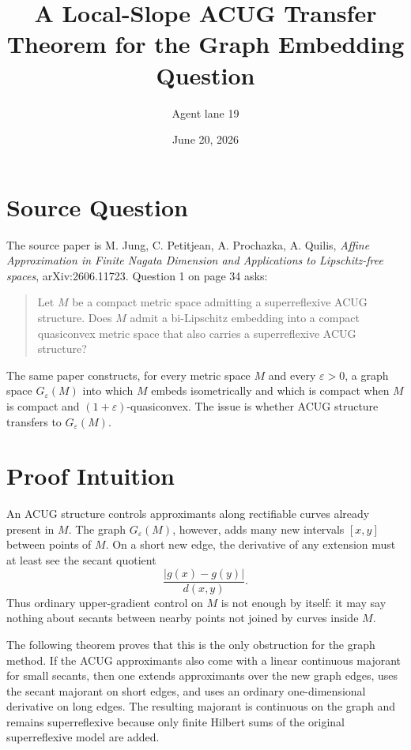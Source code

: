 \documentclass[11pt]{article}
\title{A Local-Slope ACUG Transfer Theorem for the Graph Embedding Question}
\author{Agent lane 19}
\date{June 20, 2026}
\newcommand{\eps}{\varepsilon}
\begin{document}
\maketitle

\section*{Source Question}

The source paper is M. Jung, C. Petitjean, A. Prochazka, A. Quilis,
\emph{Affine Approximation in Finite Nagata Dimension and Applications to
Lipschitz-free spaces}, arXiv:2606.11723.
Question 1 on page 34 asks:
\begin{quote}
Let \(M\) be a compact metric space admitting a superreflexive ACUG structure.
Does \(M\) admit a bi-Lipschitz embedding into a compact quasiconvex metric
space that also carries a superreflexive ACUG structure?
\end{quote}

The same paper constructs, for every metric space \(M\) and every
\(\eps>0\), a graph space \(G_\eps(M)\) into which \(M\) embeds isometrically
and which is compact when \(M\) is compact and \((1+\eps)\)-quasiconvex.
The issue is whether ACUG structure transfers to \(G_\eps(M)\).

\section*{Proof Intuition}

An ACUG structure controls approximants along rectifiable curves already
present in \(M\).  The graph \(G_\eps(M)\), however, adds many new intervals
\([x,y]\) between points of \(M\).  On a short new edge, the derivative of any
extension must at least see the secant quotient
\[
   \frac{|g(x)-g(y)|}{d(x,y)}.
\]
Thus ordinary upper-gradient control on \(M\) is not enough by itself: it may
say nothing about secants between nearby points not joined by curves inside
\(M\).

The following theorem proves that this is the only obstruction for the graph
method.  If the ACUG approximants also come with a linear continuous majorant
for small secants, then one extends approximants over the new graph edges,
uses the secant majorant on short edges, and uses an ordinary one-dimensional
derivative on long edges.  The resulting majorant is continuous on the graph
and remains superreflexive because only finite Hilbert sums of the original
superreflexive model are added.
\end{document}
